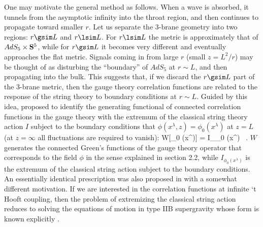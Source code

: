 One may motivate the general method
as follows. When a wave is absorbed, it tunnels from the asymptotic
infinity into the throat region, and then continues to propagate
toward smaller $r$. Let us separate the 3-brane geometry into two
regions: $r\gsim L$ and $r\lsim L$. For $r\lsim L$ the metric is
approximately that of $AdS_5\times {\bf S}^5$, while for $r\gsim L$
it becomes very different and eventually approaches the flat metric.
Signals coming in from large $r$ (small $z=L^2/r$)
may be thought of as disturbing the
``boundary'' of $AdS_5$ at $r\sim L$, and then propagating into the
bulk. This suggests that, if we discard the $r\gsim L$ part of the
3-brane metric, then 
the gauge theory correlation functions are related to
the response of the string theory to boundary conditions at $r\sim L$.
Guided by this idea, \cite{US} proposed
to identify the generating functional of connected
correlation functions in the gauge theory with the extremum of the
classical string theory action $I$ subject to the boundary conditions 
that $\phi(x^\lambda, z) = \phi_0 (x^\lambda)$ at
$z=L$ (at $z=\infty$ all fluctuations are required to vanish): 
\be \label{GKPW}
   W[\phi_0 (x^\lambda)] = I_{\phi_0 (x^\lambda)} 
     \ . 
\ee 
 $W$ generates the connected Green's functions of the gauge theory
operator that corresponds to the field $\phi$ in the sense explained
in section 2.2, 
while $I_{\phi_0 (x^\lambda)} $ 
is the extremum of the classical string action
subject to the boundary conditions. 
An essentially identical prescription
was also proposed in \cite{EW} with a somewhat different motivation.
If we are interested in the
correlation functions at infinite `t Hooft coupling, then the
problem of extremizing the
classical string action reduces to solving the equations of
motion in type IIB supergravity whose form is known explicitly
\cite{SH}.

